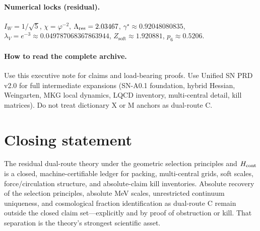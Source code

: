 \documentclass[11pt,a4paper]{article}
\theoremstyle{remark}
\begin{document}
\paragraph{Numerical locks (residual).}
$I_W=1/\sqrt{5}$, $\chi=\varphi^{-2}$, $\Lambda_{\rm res}=2.03467$, $\gamma^\star\approx 0.92048080835$, $\lambda_V=e^{-3}\approx 0.049787068367863944$, $Z_{\mathrm{soft}}\approx 1.920881$, $p_6\approx 0.5206$.

\paragraph{How to read the complete archive.}
Use this executive note for claims and load-bearing proofs. Use Unified SN PRD v2.0 for full intermediate expansions (SN-A0.1 foundation, hybrid Hessian, Weingarten, MKG local dynamics, LQCD inventory, multi-central detail, kill matrices). Do not treat dictionary X or M anchors as dual-route C.

\section*{Closing statement}
The residual dual-route theory under the geometric selection principles and $H_{\rm cont}$ is a closed, machine-certifiable ledger for packing, multi-central grids, soft scales, force/circulation structure, and absolute-claim kill inventories. Absolute recovery of the selection principles, absolute MeV scales, unrestricted continuum uniqueness, and cosmological fraction identification as dual-route C remain outside the closed claim set---explicitly and by proof of obstruction or kill. That separation is the theory's strongest scientific asset.
\end{document}
